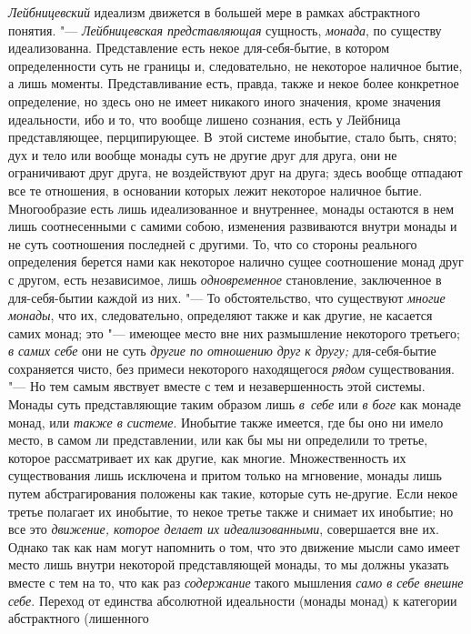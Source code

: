 {\em Лейбницевский} идеализм движется в большей мере в
рамках абстрактного понятия. "--- {\em Лейбницевская
представляющая} сущность, {\em монада}, по существу
идеализованна. Представление есть некое для-себя-бытие, в котором
определенности суть не границы и, следовательно, не некоторое наличное
бытие, а лишь моменты. Представливание есть, правда, также и некое более
конкретное определение, но здесь оно не имеет никакого иного значения,
кроме значения идеальности, ибо и то, что вообще лишено сознания, есть у
Лейбница представляющее, перципирующее. В~этой системе инобытие, стало
быть, снято; дух и тело или вообще монады суть не другие друг для друга,
они не ограничивают друг друга, не воздействуют друг на друга; здесь вообще
отпадают все те отношения, в основании которых лежит некоторое наличное
бытие. Многообразие есть лишь идеализованное и внутреннее, монады остаются
в нем лишь соотнесенными с самими собою, изменения развиваются внутри
монады и не суть соотношения последней с другими. То, что со стороны
реального определения берется нами как некоторое налично сущее соотношение
монад друг с другом, есть независимое, лишь
{\em одновременное} становление, заключенное в
для-себя-бытии каждой из них. "--- То обстоятельство, что существуют
{\em многие монады}, что их, следовательно, определяют
также и как другие, не касается самих монад; это "--- имеющее место вне них
размышление некоторого третьего; {\em в самих себе} они
не суть {\em другие по отношению друг к другу;}
для-себя-бытие сохраняется чисто, без примеси некоторого находящегося
{\em рядом} существования. "--- Но тем самым явствует
вместе с тем и незавершенность этой системы. Монады суть представляющие
таким образом лишь {\em в~себе} или {\em в боге} как монаде монад, или
{\em также в системе}. Инобытие также имеется, где бы
оно ни имело место, в самом ли представлении, или как бы мы ни определили
то третье, которое рассматривает их как другие, как многие. Множественность
их существования лишь исключена и притом только на мгновение, монады лишь
путем абстрагирования положены как такие, которые суть не-другие. Если
некое третье полагает их инобытие, то некое третье также и снимает их
инобытие; но все это {\em движение, которое делает их
идеализованными}, совершается вне их. Однако так как нам могут напомнить о
том, что это движение мысли само имеет место лишь внутри некоторой
представляющей монады, то мы должны указать вместе с тем на то, что как раз
{\em содержание} такого мышления
{\em само в себе внешне себе}. Переход от единства
абсолютной идеальности (монады монад) к категории абстрактного (лишенного
